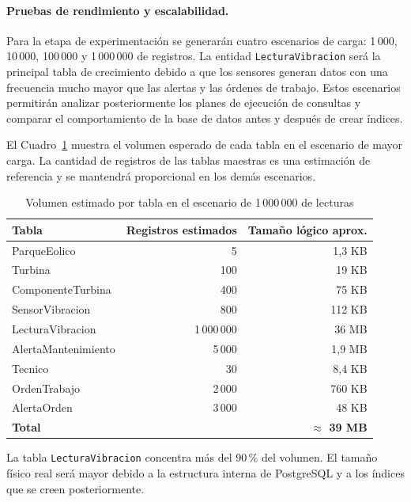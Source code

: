\documentclass[11pt,a4paper]{article}
\begin{document}
\paragraph{Pruebas de rendimiento y escalabilidad.}
Para la etapa de experimentación se generarán cuatro escenarios de carga:
1\,000, 10\,000, 100\,000 y 1\,000\,000 de registros. La entidad
\texttt{LecturaVibracion} será la principal tabla de crecimiento debido a que los
sensores generan datos con una frecuencia mucho mayor que las alertas y las órdenes
de trabajo. Estos escenarios permitirán analizar posteriormente los planes de
ejecución de consultas y comparar el comportamiento de la base de datos antes y
después de crear índices.

El Cuadro~\ref{tab:volumen_estimado} muestra el volumen esperado de cada tabla en el
escenario de mayor carga. La cantidad de registros de las tablas maestras es una
estimación de referencia y se mantendrá proporcional en los demás escenarios.

\begin{table}[H]
\centering
\small
\caption{Volumen estimado por tabla en el escenario de 1\,000\,000 de lecturas}
\label{tab:volumen_estimado}
\begin{tabular}{|l|r|r|}
\hline
\textbf{Tabla} & \textbf{Registros estimados} & \textbf{Tamaño lógico aprox.} \\ \hline
ParqueEolico & 5 & 1,3 KB \\ \hline
Turbina & 100 & 19 KB \\ \hline
ComponenteTurbina & 400 & 75 KB \\ \hline
SensorVibracion & 800 & 112 KB \\ \hline
LecturaVibracion & 1\,000\,000 & 36 MB \\ \hline
AlertaMantenimiento & 5\,000 & 1,9 MB \\ \hline
Tecnico & 30 & 8,4 KB \\ \hline
OrdenTrabajo & 2\,000 & 760 KB \\ \hline
AlertaOrden & 3\,000 & 48 KB \\ \hline
\textbf{Total} & & \textbf{$\approx$ 39 MB} \\ \hline
\end{tabular}
\end{table}

La tabla \texttt{LecturaVibracion} concentra más del 90\,\% del volumen. El tamaño
físico real será mayor debido a la estructura interna de PostgreSQL y a los índices
que se creen posteriormente.
\end{document}
